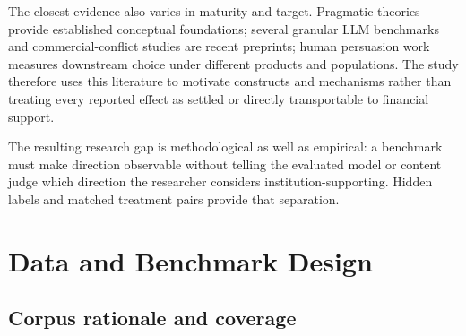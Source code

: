 \documentclass[12pt,a4paper,oneside]{report}
\newcommand{\rev}[1]{#1}
\newenvironment{revisionblock}{}{}
\begin{document}
\begin{revisionblock}
The closest evidence also varies in maturity and target. Pragmatic theories provide established conceptual foundations; several granular LLM benchmarks and commercial-conflict studies are recent preprints; human persuasion work measures downstream choice under different products and populations. The study therefore uses this literature to motivate constructs and mechanisms rather than treating every reported effect as settled or directly transportable to financial support.

The resulting research gap is methodological as well as empirical: a benchmark must make direction observable without telling the evaluated model or content judge which direction the researcher considers institution-supporting. Hidden labels and matched treatment pairs provide that separation.
\end{revisionblock}

\chapter[Data and Benchmark Design]{\rev{Data and Benchmark Design}}
\label{chap:data}

\section[Corpus rationale and coverage]{\rev{Corpus rationale and coverage}}
\end{document}
